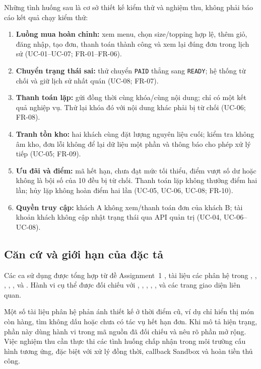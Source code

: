 Những tình huống sau là cơ sở thiết kế kiểm thử và nghiệm thu, không phải
báo cáo kết quả chạy kiểm thử:
\begin{enumerate}[nosep]
  \item \textbf{Luồng mua hoàn chỉnh:} xem menu, chọn size/topping hợp
  lệ, thêm giỏ, đăng nhập, tạo đơn, thanh toán thành công và xem lại đúng
  đơn trong lịch sử (UC-01--UC-07; FR-01--FR-06).
  \item \textbf{Chuyển trạng thái sai:} thử chuyển
  \texttt{PAID} thẳng sang \texttt{READY}; hệ thống từ chối và giữ lịch
  sử nhất quán (UC-08; FR-07).
  \item \textbf{Thanh toán lặp:} gửi đồng thời cùng khóa/cùng nội dung;
  chỉ có một kết quả nghiệp vụ. Thử lại khóa đó với nội dung khác phải
  bị từ chối (UC-06; FR-08).
  \item \textbf{Tranh tồn kho:} hai khách cùng đặt lượng nguyên liệu
  cuối; kiểm tra không âm kho, đơn lỗi không để lại dữ liệu một phần và
  thông báo cho phép xử lý tiếp (UC-05; FR-09).
  \item \textbf{Ưu đãi và điểm:} mã hết hạn, chưa đạt mức tối thiểu,
  điểm vượt số dư hoặc không là bội số của 10 đều bị từ chối. Thanh toán
  lặp không thưởng điểm hai lần; hủy lặp không hoàn điểm hai lần
  (UC-05, UC-06, UC-08; FR-10).
  \item \textbf{Quyền truy cập:} khách A không xem/thanh toán đơn của
  khách B; tài khoản khách không cập nhật trạng thái qua API quản trị
  (UC-04, UC-06--UC-08).
\end{enumerate}

\subsection{Căn cứ và giới hạn của đặc tả}

Các ca sử dụng được tổng hợp từ đề Assignment~1
, tài liệu các phân hệ trong
, , ,
, ,  và
. Hành vi cụ thể được đối chiếu với
,
,
,
,
,
 và các trang giao diện liên quan.

Một số tài liệu phân hệ phản ánh thiết kế ở thời điểm cũ, ví dụ chỉ hiển
thị món còn hàng, tìm không dấu hoặc chưa có tác vụ hết hạn đơn. Khi mô
tả hiện trạng, phần này dùng hành vi trong mã nguồn đã đối chiếu và nêu
rõ phần mở rộng. Việc nghiệm thu cần thực thi các tình huống chấp nhận
trong môi trường cấu hình tương ứng, đặc biệt với xử lý đồng thời,
callback Sandbox và hoàn tiền thủ công.
